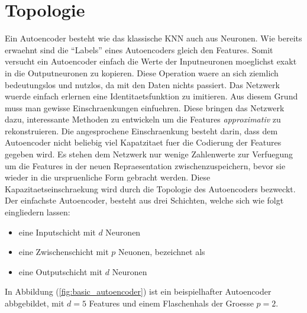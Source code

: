 \section{Topologie}
Ein Autoencoder besteht wie das klassische KNN auch aus Neuronen.
Wie bereits erwaehnt sind die ``Labels'' eines Autoencoders gleich
den Features. Somit versucht ein Autoencoder einfach die Werte der Inputneuronen
moeglichst exakt in die Outputneuronen zu kopieren.
Diese Operation waere an sich ziemlich bedeutungslos und nutzlos, da mit den
Daten nichts passiert. Das Netzwerk wuerde einfach erlernen eine
Identitaetsfunktion zu imitieren.
Aus diesem Grund muss man gewisse Einschraenkungen einfuehren. Diese bringen das Netzwerk dazu,
interessante Methoden zu entwickeln um die Features \textit{approximativ} zu rekonstruieren.
\para{}
Die angesprochene Einschraenkung besteht darin, dass dem Autoencoder nicht
beliebig viel Kapatzitaet fuer die Codierung der Features gegeben wird.
Es stehen dem Netzwerk nur wenige Zahlenwerte zur Verfuegung um die Features
in der neuen Repraesentation zwischenzuspeichern, bevor sie wieder in die urspruenliche Form gebracht werden.
Diese Kapazitaetseinschraekung wird durch die Topologie des Autoencoders bezweckt.
\para{}
\bigskip
Der einfachste Autoencoder, besteht aus drei Schichten, welche sich wie folgt
eingliedern lassen:
\begin{itemize}
\item{eine Inputschicht mit $d$ Neuronen}
\item{eine Zwischenschicht mit $p$ Neuonen, bezeichnet als }
\item{eine Outputschicht mit $d$ Neuronen}
\end{itemize}
In Abbildung (\ref{fig:basic_autoencoder}) ist
ein beispielhafter Autoencoder abbgebildet, mit $d = 5$ Features und einem
Flaschenhals der Groesse $p = 2$.
